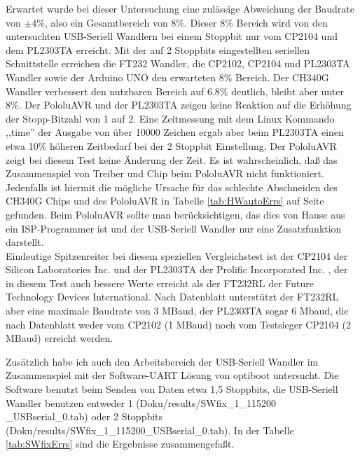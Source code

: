 Erwartet wurde bei dieser Untersuchung eine zulässige Abweichung der Baudrate von $\pm 4\%$,
also ein Gesamtbereich von 8\%. Dieser 8\% Bereich wird von den untersuchten USB-Seriell Wandlern
bei einem Stoppbit nur vom CP2104 und dem PL2303TA erreicht.
Mit der auf 2 Stoppbits eingestellten seriellen Schnittstelle erreichen
die FT232 Wandler, die CP2102, CP2104 und PL2303TA Wandler sowie der Arduino UNO den erwarteten 8\% Bereich.
Der CH340G Wandler verbessert den nutzbaren Bereich auf 6.8\% deutlich, bleibt aber unter 8\%.
Der PololuAVR und der PL2303TA zeigen keine Reaktion auf die Erhöhung der Stopp-Bitzahl von 1 auf 2.
Eine Zeitmessung mit dem Linux Kommando ,,time'' der Ausgabe von über 10000 Zeichen ergab aber beim PL2303TA
einen etwa 10\% höheren Zeitbedarf bei der 2 Stoppbit Einstellung.
Der PololuAVR zeigt bei diesem Test keine Änderung der Zeit.
Es ist wahrscheinlich, daß das Zusammenspiel von Treiber und Chip beim PololuAVR nicht funktioniert.\\

Jedenfalls ist hiermit die mögliche Ursache für das schlechte Abschneiden des CH340G Chips
und des PololuAVR in Tabelle \ref{tab:HWautoErrs} auf Seite \pageref{tab:HWautoErrs} gefunden.
Beim PololuAVR sollte man berücksichtigen, das dies von Hause aus
ein ISP-Programmer ist und der USB-Seriell Wandler nur eine Zusatzfunktion darstellt.\\
Eindeutige Spitzenreiter bei diesem speziellen Vergleichstest ist der CP2104 der Silicon Laboratories Inc. und
der PL2303TA der Prolific Incorporated Inc. ,
der in diesem Test auch bessere Werte erreicht als der FT232RL der Future Technology Devices International.
Nach Datenblatt unterstützt der FT232RL aber eine maximale Baudrate von 3 MBaud, der PL2303TA sogar
6 Mbaud, die nach Datenblatt weder vom CP2102 (1 MBaud) noch vom Testsieger CP2104 (2 MBaud) erreicht werden.

Zusätzlich habe ich auch den Arbeitsbereich der USB-Seriell Wandler im Zusammenspiel mit der
Software-UART Lösung von optiboot untersucht. Die Software benutzt beim Senden von Daten etwa 1,5 Stoppbits,
die USB-Seriell Wandler benutzen entweder 1 (Doku/results/SWfix\_1\_115200 \_USBserial\_0.tab) oder
2 Stoppbits (Doku/results/SWfix\_1\_115200\_USBserial\_0.tab). In der Tabelle \ref{tab:SWfixErrs} sind
die Ergebnisse zusammengefaßt.

